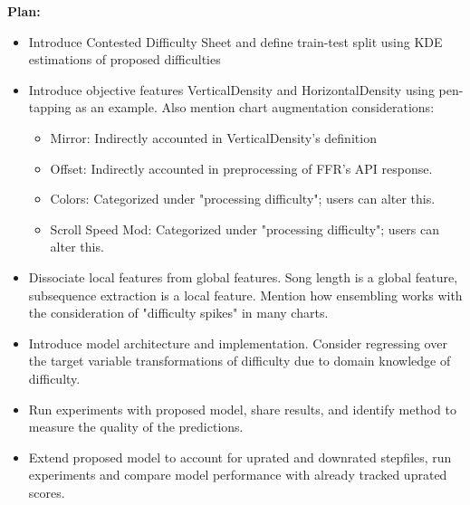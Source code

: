 \textbf{Plan:}
\begin{itemize}
	      	      
	      \item{Introduce Contested Difficulty Sheet and define train-test split using KDE estimations of proposed difficulties}
	      	      
	      \item{Introduce objective features VerticalDensity and HorizontalDensity using pen-tapping as an example. Also mention chart augmentation considerations:}
	      \begin{itemize}
	      	\item Mirror: Indirectly accounted in VerticalDensity's definition
	      	\item Offset: Indirectly accounted in preprocessing of FFR's API response.
	      	\item Colors: Categorized under "processing difficulty"; users can alter this.
	      	\item Scroll Speed Mod: Categorized under "processing difficulty"; users can alter this.
	      \end{itemize}
	      	      
	\item Dissociate local features from global features. Song length is a global feature, subsequence extraction is a local feature. Mention how ensembling works with the consideration of "difficulty spikes" in many charts.
	      	      
	\item Introduce model architecture and implementation. Consider regressing over the target variable transformations of difficulty due to domain knowledge of difficulty.
	      	      
	\item Run experiments with proposed model, share results, and identify method to measure the quality of the predictions.
	      	      
	\item Extend proposed model to account for uprated and downrated stepfiles, run experiments and compare model performance with already tracked uprated scores.
	      	          
\end{itemize}

\vspace{2mm}



